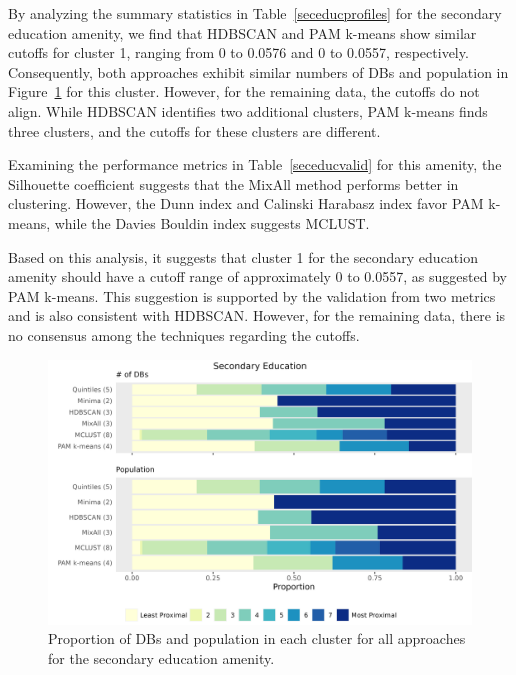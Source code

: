 \documentclass[11pt, a4paper]{article}
\begin{document}
By analyzing the summary statistics in Table~\ref{seceducprofiles} for the secondary education amenity, we find that HDBSCAN and PAM k-means show similar cutoffs for cluster 1, ranging from 0 to 0.0576 and 0 to 0.0557, respectively. Consequently, both approaches exhibit similar numbers of DBs and population in Figure~\ref{seceducbarplot} for this cluster. However, for the remaining data, the cutoffs do not align. While HDBSCAN identifies two additional clusters, PAM k-means finds three clusters, and the cutoffs for these clusters are different.
\par
Examining the performance metrics in Table~\ref{seceducvalid} for this amenity, the Silhouette coefficient suggests that the MixAll method performs better in clustering. However, the Dunn index and Calinski Harabasz index favor PAM k-means, while the Davies Bouldin index suggests MCLUST.
\par
Based on this analysis, it suggests that cluster 1 for the secondary education amenity should have a cutoff range of approximately 0 to 0.0557, as suggested by PAM k-means. This suggestion is supported by the validation from two metrics and is also consistent with HDBSCAN. However, for the remaining data, there is no consensus among the techniques regarding the cutoffs.



\begin{figure}[H]
\centering
\includegraphics[width=\textwidth]{./barplot_comparison/Secondary Education_barplot.png}
\caption[Secondary education profile barplot]{Proportion of DBs and population in each cluster for all approaches for the secondary education amenity.}\label{seceducbarplot}
\end{figure}
\end{document}
